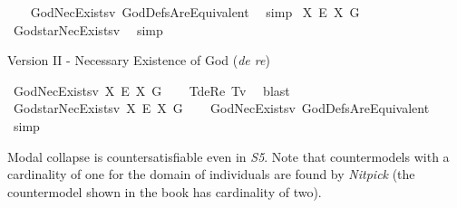 \begin{isabellebody}
%
\ \ %
%
\isamarkupfalse%
\ GodNecExists{\isacharunderscore}v{}\ GodDefsAreEquivalent\ \isamarkupfalse%
\ simp%
%
\isanewline
%
\isamarkupfalse%
\ {\isachardoublequoteopen}{\isasymlfloor}\isactrlbold {\isasymbox}{\isacharparenleft}{\isasymlambda}X{\isachardot}\ \isactrlbold {\isasymexists}\isactrlsup E\ X{\isacharparenright}\ \isactrlbold {\isasymdown}G{\isacharasterisk}{\isasymrfloor}{\isachardoublequoteclose}\isanewline
%
\ \ %
%
\isamarkupfalse%
\ God{\isacharunderscore}starNecExists{\isacharunderscore}v{}\ \isamarkupfalse%
\ simp\ %
%
%
%
%
\begin{isamarkuptext}%
Version II - Necessary Existence of God (\emph{de re})%
\end{isamarkuptext}\isamarkuptrue%
\isamarkupfalse%
\ GodNecExists{\isacharunderscore}v{}{\isacharcolon}\ {\isachardoublequoteopen}{\isasymlfloor}{\isacharparenleft}{\isasymlambda}X{\isachardot}\ \isactrlbold {\isasymbox}\isactrlbold {\isasymexists}\isactrlsup E\ X{\isacharparenright}\ \isactrlbold {\isasymdown}G{\isasymrfloor}{\isachardoublequoteclose}\isanewline
%
\ \ %
%
\isamarkupfalse%
\ T{}{\isacharunderscore}deRe\ T{}{\isacharunderscore}v{}\ \isamarkupfalse%
\ blast%
%
\isanewline
%
\isamarkupfalse%
\ God{\isacharunderscore}starNecExists{\isacharunderscore}v{}{\isacharcolon}\ {\isachardoublequoteopen}{\isasymlfloor}{\isacharparenleft}{\isasymlambda}X{\isachardot}\ \isactrlbold {\isasymbox}\isactrlbold {\isasymexists}\isactrlsup E\ X{\isacharparenright}\ \isactrlbold {\isasymdown}G{\isacharasterisk}{\isasymrfloor}{\isachardoublequoteclose}\isanewline
%
\ \ %
%
\isamarkupfalse%
\ GodNecExists{\isacharunderscore}v{}\ GodDefsAreEquivalent\ \isamarkupfalse%
\ simp%
%
%
%
\isamarkuptrue%
%
\begin{isamarkuptext}%
Modal collapse is countersatisfiable even in \emph{S5}. Note that countermodels with a cardinality of one 
for the domain of individuals are found by \emph{Nitpick} (the countermodel shown in the book has cardinality of two).%
\end{isamarkuptext}\isamarkuptrue%
\isamarkupfalse%
\ {\isachardoublequoteopen}{\isasymlfloor}\isactrlbold {\isasymforall}{\isasymPhi}{\isachardot}{\isacharparenleft}{\isasymPhi}\ \isactrlbold {\isasymrightarrow}\ {\isacharparenleft}\isactrlbold {\isasymbox}\ {\isasymPhi}{\isacharparenright}{\isacharparenright}{\isasymrfloor}{\isachardoublequoteclose}\ \isanewline

\end{isabellebody}
